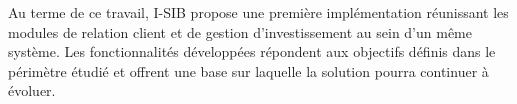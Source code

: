 Au terme de ce travail, I-SIB propose une première implémentation réunissant les modules de relation client et de gestion d'investissement au sein d'un même système. Les fonctionnalités développées répondent aux objectifs définis dans le périmètre étudié et offrent une base sur laquelle la solution pourra continuer à évoluer.

